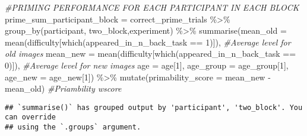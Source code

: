 \documentclass[
]{article}
\newenvironment{Shaded}{\begin{snugshade}}{\end{snugshade}}
\newcommand{\AttributeTok}[1]{\textcolor[rgb]{0.77,0.63,0.00}{#1}}
\newcommand{\CommentTok}[1]{\textcolor[rgb]{0.56,0.35,0.01}{\textit{#1}}}
\newcommand{\DecValTok}[1]{\textcolor[rgb]{0.00,0.00,0.81}{#1}}
\newcommand{\FunctionTok}[1]{\textcolor[rgb]{0.00,0.00,0.00}{#1}}
\newcommand{\NormalTok}[1]{#1}
\newcommand{\OtherTok}[1]{\textcolor[rgb]{0.56,0.35,0.01}{#1}}
\newcommand{\SpecialCharTok}[1]{\textcolor[rgb]{0.00,0.00,0.00}{#1}}
\begin{document}
\begin{Shaded}
\begin{Highlighting}[]
\CommentTok{\#PRIMING PERFORMANCE FOR EACH PARTICIPANT IN EACH BLOCK}
\NormalTok{prime\_sum\_participant\_block }\OtherTok{=}\NormalTok{ correct\_prime\_trials }\SpecialCharTok{\%\textgreater{}\%} 
  \FunctionTok{group\_by}\NormalTok{(participant, two\_block,experiment) }\SpecialCharTok{\%\textgreater{}\%} 
  \FunctionTok{summarise}\NormalTok{(}\AttributeTok{mean\_old =} \FunctionTok{mean}\NormalTok{(difficulty[}\FunctionTok{which}\NormalTok{(appeared\_in\_n\_back\_task }\SpecialCharTok{==} \DecValTok{1}\NormalTok{)]), }\CommentTok{\#Average level for old images}
            \AttributeTok{mean\_new =} \FunctionTok{mean}\NormalTok{(difficulty[}\FunctionTok{which}\NormalTok{(appeared\_in\_n\_back\_task }\SpecialCharTok{==} \DecValTok{0}\NormalTok{)]), }\CommentTok{\#Average level for new images}
            \AttributeTok{age =}\NormalTok{ age[}\DecValTok{1}\NormalTok{],}
            \AttributeTok{age\_group =}\NormalTok{ age\_group[}\DecValTok{1}\NormalTok{],}
            \AttributeTok{age\_new =}\NormalTok{ age\_new[}\DecValTok{1}\NormalTok{]) }\SpecialCharTok{\%\textgreater{}\%}
  \FunctionTok{mutate}\NormalTok{(}\AttributeTok{primability\_score =}\NormalTok{ mean\_new }\SpecialCharTok{{-}}\NormalTok{ mean\_old) }\CommentTok{\#Priambility wscore}
\end{Highlighting}
\end{Shaded}

\begin{verbatim}
## `summarise()` has grouped output by 'participant', 'two_block'. You can override
## using the `.groups` argument.
\end{verbatim}
\end{document}
